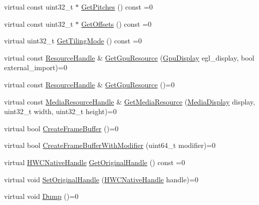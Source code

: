 \begin{DoxyCompactItemize}
\item 
virtual const uint32\+\_\+t $\ast$ \mbox{\hyperlink{classhwcomposer_1_1OverlayBuffer_aa359c9f8d8c6fbcaf4ee2268e4d377f6}{Get\+Pitches}} () const =0
\item 
virtual const uint32\+\_\+t $\ast$ \mbox{\hyperlink{classhwcomposer_1_1OverlayBuffer_ab2ebf4c92de3d7ad57f108871fa58d24}{Get\+Offsets}} () const =0
\item 
virtual uint32\+\_\+t \mbox{\hyperlink{classhwcomposer_1_1OverlayBuffer_a031e9b24c6dcbdd8a4ae6d842dac5db0}{Get\+Tiling\+Mode}} () const =0
\item 
virtual const \mbox{\hyperlink{namespacehwcomposer_a963c5a1d5902d2d05710dba19af35b48}{Resource\+Handle}} \& \mbox{\hyperlink{classhwcomposer_1_1OverlayBuffer_a121d2b77c40a30725d804cee4d2107a5}{Get\+Gpu\+Resource}} (\mbox{\hyperlink{namespacehwcomposer_ace90739a34de8ec5b30559423cdef990}{Gpu\+Display}} egl\+\_\+display, bool external\+\_\+import)=0
\item 
virtual const \mbox{\hyperlink{namespacehwcomposer_a963c5a1d5902d2d05710dba19af35b48}{Resource\+Handle}} \& \mbox{\hyperlink{classhwcomposer_1_1OverlayBuffer_a8cf41eb9f46a27d3ac2c6e5cf4f310b4}{Get\+Gpu\+Resource}} ()=0
\item 
virtual const \mbox{\hyperlink{namespacehwcomposer_aa99e35835961ac7d6baa59a04131ff42}{Media\+Resource\+Handle}} \& \mbox{\hyperlink{classhwcomposer_1_1OverlayBuffer_a947d4a8ef39b9a1a254325e32d4a45c2}{Get\+Media\+Resource}} (\mbox{\hyperlink{namespacehwcomposer_a10d64930907cc775f9cea6b39d8cb404}{Media\+Display}} display, uint32\+\_\+t width, uint32\+\_\+t height)=0
\item 
virtual bool \mbox{\hyperlink{classhwcomposer_1_1OverlayBuffer_ac680ba90c1b51512ad7c0b2a6483b39c}{Create\+Frame\+Buffer}} ()=0
\item 
virtual bool \mbox{\hyperlink{classhwcomposer_1_1OverlayBuffer_ab7f56dcd75f7724d8b1b2ca384f91312}{Create\+Frame\+Buffer\+With\+Modifier}} (uint64\+\_\+t modifier)=0
\item 
virtual \mbox{\hyperlink{alios_2platformdefines_8h_ac0a2eaf260f556d17fe489911f017bdf}{H\+W\+C\+Native\+Handle}} \mbox{\hyperlink{classhwcomposer_1_1OverlayBuffer_a29ba52c586290b087991e195212c53f2}{Get\+Original\+Handle}} () const =0
\item 
virtual void \mbox{\hyperlink{classhwcomposer_1_1OverlayBuffer_a458dd8327bacb7a6560ac539e76ae408}{Set\+Original\+Handle}} (\mbox{\hyperlink{alios_2platformdefines_8h_ac0a2eaf260f556d17fe489911f017bdf}{H\+W\+C\+Native\+Handle}} handle)=0
\item 
virtual void \mbox{\hyperlink{classhwcomposer_1_1OverlayBuffer_a0f1c365c9c73e7608d07cf699279ddcb}{Dump}} ()=0
\end{DoxyCompactItemize}
